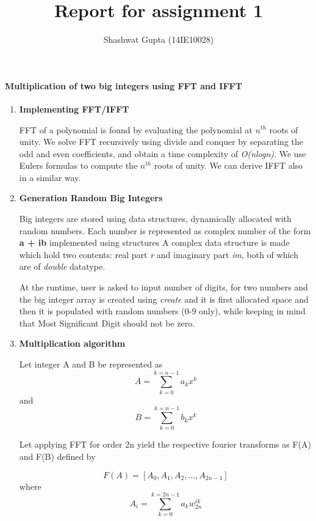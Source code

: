 \documentclass[a4paper,11pt]{article}
\title{Report for assignment 1}
\author{Shashwat Gupta (14IE10028)}
\begin{document}
\maketitle

\paragraph{Multiplication of two big integers using FFT and IFFT}
\begin{enumerate}
 \item \textbf{Implementing FFT/IFFT}

FFT of a polynomial is found by evaluating the polynomial at $n^{th}$ roots of unity. We solve FFT recursively using divide and conquer by separating the odd and even coefficients, and obtain a time complexity of \emph{O(nlogn)}. We use Eulers formulas to compute the $n^{th}$ roots of unity. We can derive IFFT also in a similar way.

\item \textbf{Generation Random Big Integers}

Big integers are stored using data structures, dynamically allocated with random numbers.
Each number is represented as complex number of the form \textbf{a + ib} implemented using structures
A complex data structure is made which hold two contents: real part \emph{r} and imaginary part \emph{im}, both of which are of \emph{double} datatype.

At the runtime, user is asked to input number of digits, for two numbers and the big integer array is created using \emph{create} and it is first allocated space and then it is populated with random numbers (0-9 only), while keeping in mind that Most Significant Digit should not be zero.

\item \textbf{Multiplication algorithm}

Let integer A and B be represented as
\begin{equation}
A = \sum_{k=0}^{k=n-1} a_{k}x^k
\end{equation}
and 
\begin{equation}
B = \sum_{k=0}^{k=n-1} b_{k}x^k
\end{equation}

Let applying FFT for order 2n yield the respective fourier transforms as F(A) and F(B) defined by

\begin{equation}
F(A) = [A_{0}, A_{1}, A_{2}, ..., A_{2n-1}]\end{equation} where \begin{equation}
A_i = \sum_{k=0}^{k=2n-1} a_{k}w_{2n}^{ik}\end{equation}


\end{enumerate}
\end{document}
